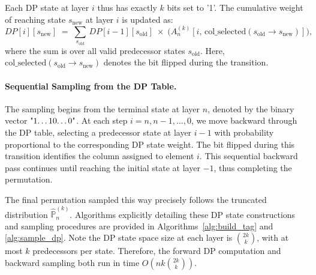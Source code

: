 \documentclass{article}
\renewcommand{\P}{\mathbb{P}}
\begin{document}
Each DP state at layer $i$ thus has exactly $k$ bits set to '1'. The cumulative weight of reaching state $s_{\text{new}}$ at layer $i$ is updated as:
\[
  DP[i][s_{\text{new}}] 
  \;=\; \sum_{s_{\text{old}}}\, 
  DP[i-1][s_{\text{old}}]
  \;\times\; \bigl(A_n^{(k)}[i,\, \text{col\_selected}(s_{\text{old}}\!\to\!s_{\text{new}})]\bigr),
\]
where the sum is over all valid predecessor states $s_{\text{old}}$.
Here, $\text{col\_selected}(s_{\text{old}} \to s_{\text{new}})$ denotes the bit flipped during the transition.

\paragraph{Sequential Sampling from the DP Table.}
The sampling begins from the terminal state at layer $n$, denoted by the binary vector $\text{"1\dots10\dots0"}$. At each step $i = n, n-1, \dots, 0$, we move backward through the DP table, selecting a predecessor state at layer $i-1$ with probability proportional to the corresponding DP state weight. The bit flipped during this transition identifies the column assigned to element $i$. This sequential backward pass continues until reaching the initial state at layer $-1$, thus completing the permutation.

The final permutation sampled this way precisely follows the truncated distribution $\hat{\P}_n^{(k)}$. Algorithms explicitly detailing these DP state constructions and sampling procedures are provided in Algorithms~\ref{alg:build_tag} and \ref{alg:sample_dp}.
Note the DP state space size at each layer is $\binom{2k}{k}$, with at most $k$ predecessors per state. Therefore, the forward DP computation and backward sampling both run in time $O\left(nk\binom{2k}{k}\right)$.


\end{document}
